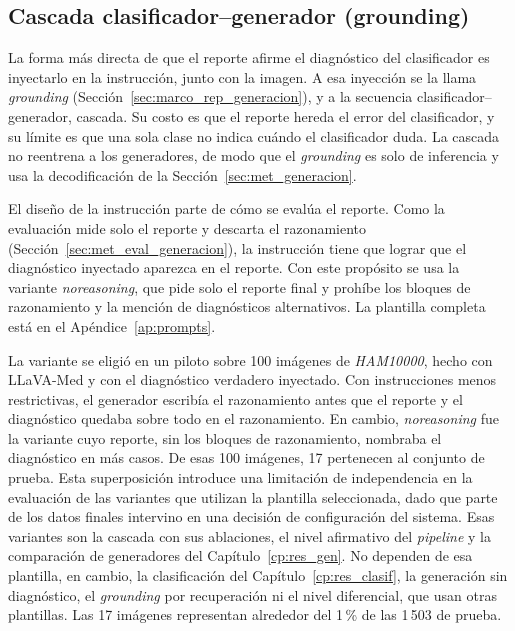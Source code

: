 \subsection{Cascada clasificador--generador (grounding)}
\label{sec:met_cascada}

La forma más directa de que el reporte afirme el diagnóstico del clasificador es inyectarlo en la instrucción, junto
con la imagen. A esa inyección se la llama \emph{grounding} (Sección~\ref{sec:marco_rep_generacion}), y a la
secuencia clasificador--generador, cascada. Su costo es que el reporte hereda el error del clasificador, y su límite es
que una sola clase no indica cuándo el clasificador duda. La cascada no reentrena a los generadores, de modo que el
\emph{grounding} es solo de inferencia y usa la decodificación de la Sección~\ref{sec:met_generacion}.

El diseño de la instrucción parte de cómo se evalúa el reporte. Como la evaluación mide solo el reporte y descarta el
razonamiento (Sección~\ref{sec:met_eval_generacion}), la instrucción tiene que lograr que el diagnóstico inyectado
aparezca en el reporte. Con este propósito se usa la variante \emph{noreasoning}, que pide solo el reporte final y
prohíbe los bloques de razonamiento y la mención de diagnósticos alternativos. La plantilla completa está en el
Apéndice~\ref{ap:prompts}.

La variante se eligió en un piloto sobre 100 imágenes de \emph{HAM10000}, hecho con LLaVA-Med y con el diagnóstico
verdadero inyectado. Con instrucciones menos restrictivas, el generador escribía el razonamiento antes que el reporte y el
diagnóstico quedaba sobre todo en el razonamiento. En cambio, \emph{noreasoning} fue la variante cuyo reporte, sin
los bloques de razonamiento, nombraba el diagnóstico en más casos. De esas 100 imágenes, 17 pertenecen al conjunto de prueba. Esta superposición introduce una limitación de independencia en la evaluación de las variantes que utilizan la plantilla seleccionada, dado que parte de los datos finales intervino en una decisión de configuración del sistema. Esas variantes son la cascada con sus ablaciones, el nivel afirmativo del \emph{pipeline} y la comparación de generadores del Capítulo~\ref{cp:res_gen}. No dependen de esa plantilla, en cambio, la clasificación del Capítulo~\ref{cp:res_clasif}, la generación sin diagnóstico, el \emph{grounding} por recuperación ni el nivel diferencial, que usan otras plantillas. Las 17 imágenes representan alrededor del 1\,\% de las 1\,503 de prueba.

